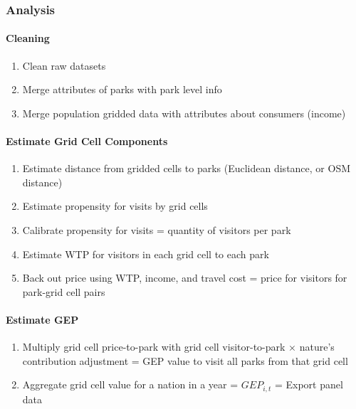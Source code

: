 \documentclass[
  letterpaper,
  DIV=11,
  numbers=noendperiod]{scrartcl}
\let\oldparagraph\paragraph
\renewcommand{\paragraph}[1]{\oldparagraph{#1}\mbox{}}
\providecommand{\tightlist}{%
  \setlength{\itemsep}{0pt}\setlength{\parskip}{0pt}}\usepackage{longtable,booktabs,array}
\begin{document}
\hypertarget{analysis}{%
\subsubsection{Analysis}\label{analysis}}

\hypertarget{cleaning}{%
\paragraph{Cleaning}\label{cleaning}}

\begin{enumerate}
\def\labelenumi{\arabic{enumi}.}
\tightlist
\item
  Clean raw datasets
\item
  Merge attributes of parks with park level info
\item
  Merge population gridded data with attributes about consumers (income)
\end{enumerate}

\hypertarget{estimate-grid-cell-components}{%
\paragraph{Estimate Grid Cell
Components}\label{estimate-grid-cell-components}}

\begin{enumerate}
\def\labelenumi{\arabic{enumi}.}
\setcounter{enumi}{3}
\tightlist
\item
  Estimate distance from gridded cells to parks (Euclidean distance, or
  OSM distance)
\item
  Estimate propensity for visits by grid cells
\item
  Calibrate propensity for visits = quantity of visitors per park
\item
  Estimate WTP for visitors in each grid cell to each park
\item
  Back out price using WTP, income, and travel cost = price for visitors
  for park-grid cell pairs
\end{enumerate}

\hypertarget{estimate-gep}{%
\paragraph{Estimate GEP}\label{estimate-gep}}

\begin{enumerate}
\def\labelenumi{\arabic{enumi}.}
\tightlist
\item
  Multiply grid cell price-to-park with grid cell visitor-to-park
  \(\times\) nature's contribution adjustment = GEP value to visit all
  parks from that grid cell
\item
  Aggregate grid cell value for a nation in a year = \(GEP_{i,t}\) =
  Export panel data
\end{enumerate}
\end{document}
